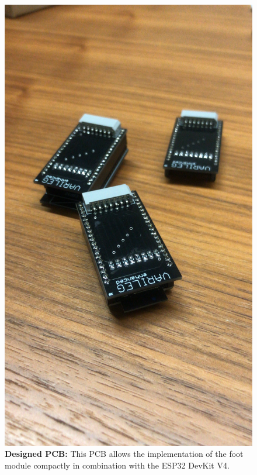 \begin{figure}[!t]
	\centering
	\includegraphics[width=1\columnwidth]{Appendix/haptic_feedback/PCB.JPG}
	\caption{\textbf{Designed PCB:}  This PCB allows the implementation of the foot module compactly in combination with the ESP32 DevKit V4.}
	\label{fig: PCB selfmade}
\end{figure}



